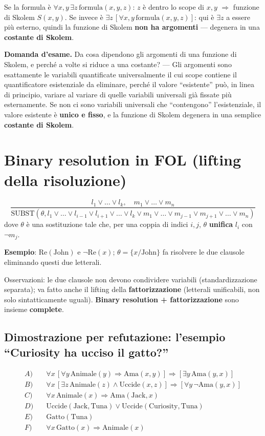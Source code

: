 \documentclass[11pt,a4paper]{report}
\newcommand{\domandaesame}[1]{\begin{esame}\textbf{Domanda d'esame.} #1\end{esame}}
\begin{document}
Se la formula è $\forall x,y\,\exists z\, \text{formula}(x,y,z)$: $z$ è dentro lo scope di $x,y$ $\Rightarrow$ funzione di Skolem $S(x,y)$. Se invece è $\exists z\,[\forall x,y\, \text{formula}(x,y,z)]$: qui è $\exists z$ a essere più esterno, quindi la funzione di Skolem \textbf{non ha argomenti} --- degenera in una \textbf{costante di Skolem}.

\domandaesame{Da cosa dipendono gli argomenti di una funzione di Skolem, e perché a volte si riduce a una costante? --- Gli argomenti sono esattamente le variabili quantificate universalmente il cui scope contiene il quantificatore esistenziale da eliminare, perché il valore ``esistente'' può, in linea di principio, variare al variare di quelle variabili universali già fissate più esternamente. Se non ci sono variabili universali che ``contengono'' l'esistenziale, il valore esistente è \textbf{unico e fisso}, e la funzione di Skolem degenera in una semplice \textbf{costante di Skolem}.}

\section{Binary resolution in FOL (lifting della risoluzione)}

\[
\frac{l_1\vee\dots\vee l_k, \quad m_1\vee\dots\vee m_n}{\text{SUBST}(\theta, l_1\vee\dots\vee l_{i-1}\vee l_{i+1}\vee\dots\vee l_k\vee m_1\vee\dots\vee m_{j-1}\vee m_{j+1}\vee\dots\vee m_n)}
\]
dove $\theta$ è una sostituzione tale che, per una coppia di indici $i,j$, $\theta$ \textbf{unifica} $l_i$ con $\neg m_j$.

\textbf{Esempio}: $\text{Re}(\text{John})$ e $\neg\text{Re}(x)$; $\theta=\{x/\text{John}\}$ fa risolvere le due clausole eliminando questi due letterali.

Osservazioni: le due clausole non devono condividere variabili (standardizzazione separata); va fatto anche il lifting della \textbf{fattorizzazione} (letterali unificabili, non solo sintatticamente uguali). \textbf{Binary resolution + fattorizzazione} sono insieme \textbf{complete}.

\subsection*{Dimostrazione per refutazione: l'esempio ``Curiosity ha ucciso il gatto?''}

\begin{align*}
A) &\quad \forall x\, [\forall y\, \text{Animale}(y) \Rightarrow \text{Ama}(x,y)] \Rightarrow [\exists y\, \text{Ama}(y,x)] \\
B) &\quad \forall x\, [\exists z\, \text{Animale}(z) \wedge \text{Uccide}(x,z)] \Rightarrow [\forall y\, \neg\text{Ama}(y,x)] \\
C) &\quad \forall x\, \text{Animale}(x) \Rightarrow \text{Ama}(\text{Jack},x) \\
D) &\quad \text{Uccide}(\text{Jack},\text{Tuna}) \vee \text{Uccide}(\text{Curiosity},\text{Tuna}) \\
E) &\quad \text{Gatto}(\text{Tuna}) \\
F) &\quad \forall x\, \text{Gatto}(x) \Rightarrow \text{Animale}(x)
\end{align*}
\end{document}
